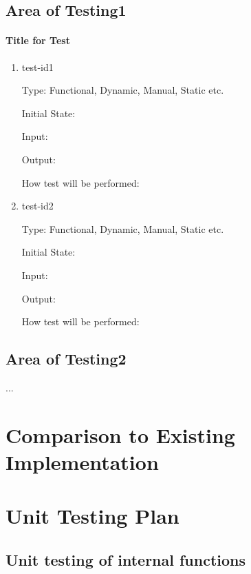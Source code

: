 \documentclass[11pt]{article}
\begin{document}
\subsection{Area of Testing1}
		
\paragraph{Title for Test}

\begin{enumerate}

\item{test-id1\\}

Type: Functional, Dynamic, Manual, Static etc.
					
Initial State: 
					
Input: 
					
Output: 
					
How test will be performed: 
					
\item{test-id2\\}

Type: Functional, Dynamic, Manual, Static etc.
					
Initial State: 
					
Input: 
					
Output: 
					
How test will be performed: 

\end{enumerate}

\subsection{Area of Testing2}

...

	
\section{Comparison to Existing Implementation}	
				
\section{Unit Testing Plan}
		
\subsection{Unit testing of internal functions}
		
\end{document}
